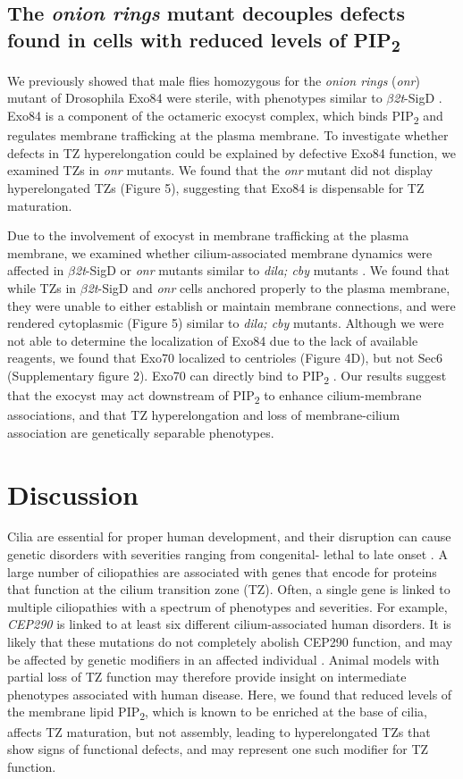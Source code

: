 \documentclass[12pt, twoside, letterpaper]{article}
\newcommand{\PIP}{PIP\textsubscript{2}}
\newcommand{\sigd}{$\beta$\textit{2t}-SigD}
\begin{document}
\subsection{The \textit{onion rings} mutant decouples defects found in cells with reduced levels of \PIP{}}
We previously showed that male flies homozygous for the \textit{onion rings}
(\textit{onr}) mutant of Drosophila Exo84 were sterile, with phenotypes
similar to \sigd{} \citep{wei2008depletion}.
Exo84 is a component of the octameric exocyst complex, which binds
\PIP{} and regulates membrane trafficking at the plasma membrane.
To investigate whether defects in TZ hyperelongation could be explained by
defective Exo84 function, we examined TZs in \textit{onr} mutants.
We found that the \textit{onr} mutant did not display hyperelongated TZs (Figure 5),
suggesting that Exo84 is dispensable for TZ maturation.

Due to the involvement of exocyst in membrane trafficking at the plasma membrane,
we examined whether cilium-associated membrane dynamics were affected in \sigd{}
or \textit{onr} mutants similar to \textit{dila; cby} mutants
\citep{vieillard2016transition}.
We found that while TZs in \sigd{} and \textit{onr} cells anchored properly
to the plasma membrane, they were unable to either establish or maintain
membrane connections, and were rendered cytoplasmic (Figure 5) similar to
\textit{dila; cby} mutants.
Although we were not able to determine the localization of Exo84 due to the
lack of available reagents,
we found that Exo70 localized to centrioles (Figure 4D),
but not Sec6 (Supplementary figure 2).
Exo70 can directly bind to \PIP{} \citep{he2007exo70}.
Our results suggest that the exocyst may act downstream of \PIP{} to
enhance cilium-membrane associations, and that TZ hyperelongation and loss of
membrane-cilium association are genetically separable phenotypes.


\section{Discussion}
Cilia are essential for proper human development, and their disruption
can cause genetic disorders with severities ranging from congenital-
lethal \citep{}
to late onset \citep{}.
A large number of ciliopathies are associated with genes that encode for
proteins that function at the cilium transition zone (TZ).
Often, a single gene is linked to multiple ciliopathies with
a spectrum of phenotypes and severities.
For example, \textit{CEP290} is linked to at least six different
cilium-associated human disorders.
It is likely that these mutations do not completely abolish CEP290
function, and may be affected by genetic modifiers in an affected individual
\citep{zaghloul2010functional, khanna2009common, leitch2008hypomorphic}.
Animal models with partial loss of TZ function may therefore provide
insight on intermediate phenotypes associated with human disease.
Here, we found that reduced levels of the membrane lipid \PIP{},
which is known to be enriched at the base of cilia,
affects TZ maturation, but not assembly,
leading to hyperelongated TZs that show signs of functional defects, and
may represent one such modifier for TZ function.
\end{document}
